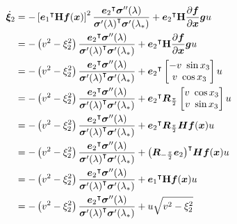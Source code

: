 \documentclass[oneside, 11pt]{book}
\begin{document}
\begin{align*}
    \dot{\bm{\xi}}_2 &=
                    -\left[{\bm{e}_1}^{\intercal}\mathbf{H}\bm{f}(\bm{x})\right]^2  \frac{{\bm{e}_2}^{\intercal}\bm{\sigma}''(\lambda)}{{\bm{\sigma}'(\lambda)}^{\intercal}\bm{\sigma}'(\lambda_*)}
                    +
                    {\bm{e}_2}^{\intercal}\mathbf{H}\frac{\partial\bm{f}}{\partial\bm{x}}\bm{g} u\\
                &=
                    -\left(v^2 - \xi_2^2\right) \frac{{\bm{e}_2}^{\intercal}\bm{\sigma}''(\lambda)}{{\bm{\sigma}'(\lambda)}^{\intercal}\bm{\sigma}'(\lambda_*)}
                    +
                    {\bm{e}_2}^{\intercal}\mathbf{H}\frac{\partial\bm{f}}{\partial\bm{x}}\bm{g} u\\
                &=
                    -\left(v^2 - \xi_2^2\right) \frac{{\bm{e}_2}^{\intercal}\bm{\sigma}''(\lambda)}{{\bm{\sigma}'(\lambda)}^{\intercal}\bm{\sigma}'(\lambda_*)}
                    +
                    {\bm{e}_2}^{\intercal}
                        \begin{bmatrix}
                            -v~\sin x_3 \\
                            v~\cos x_3
                        \end{bmatrix}
                    u\\
                &=
                    -\left(v^2 - \xi_2^2\right) \frac{{\bm{e}_2}^{\intercal}\bm{\sigma}''(\lambda)}{{\bm{\sigma}'(\lambda)}^{\intercal}\bm{\sigma}'(\lambda_*)}
                    +
                    {\bm{e}_2}^{\intercal}\bm{R}_{\frac{\pi}{2}}
                        \begin{bmatrix}
                            v~\cos x_3 \\
                            v~\sin x_3
                        \end{bmatrix}
                    u\\
                &=
                    -\left(v^2 - \xi_2^2\right) \frac{{\bm{e}_2}^{\intercal}\bm{\sigma}''(\lambda)}{{\bm{\sigma}'(\lambda)}^{\intercal}\bm{\sigma}'(\lambda_*)}
                    +
                    {\bm{e}_2}^{\intercal}\bm{R}_{\frac{\pi}{2}}\bm{H}\bm{f}(\bm{x}) u\\
                &=
                    -\left(v^2 - \xi_2^2\right) \frac{{\bm{e}_2}^{\intercal}\bm{\sigma}''(\lambda)}{{\bm{\sigma}'(\lambda)}^{\intercal}\bm{\sigma}'(\lambda_*)}
                    +
                    {\left(\bm{R}_{-\frac{\pi}{2}}\bm{e}_2\right)}^{\intercal}\bm{H}\bm{f}(\bm{x}) u\\
                &=
                    -\left(v^2 - \xi_2^2\right) \frac{{\bm{e}_2}^{\intercal}\bm{\sigma}''(\lambda)}{{\bm{\sigma}'(\lambda)}^{\intercal}\bm{\sigma}'(\lambda_*)}
                    +
                    {\bm{e}_1}^{\intercal}\mathbf{H}\bm{f}(\bm{x}) u\\
                &=
                    -\left(v^2 - \xi_2^2\right) \frac{{\bm{e}_2}^{\intercal}\bm{\sigma}''(\lambda)}{{\bm{\sigma}'(\lambda)}^{\intercal}\bm{\sigma}'(\lambda_*)}
                    +
                    u \sqrt{v^2 - \xi_2^2}\\
\end{align*}
\end{document}
